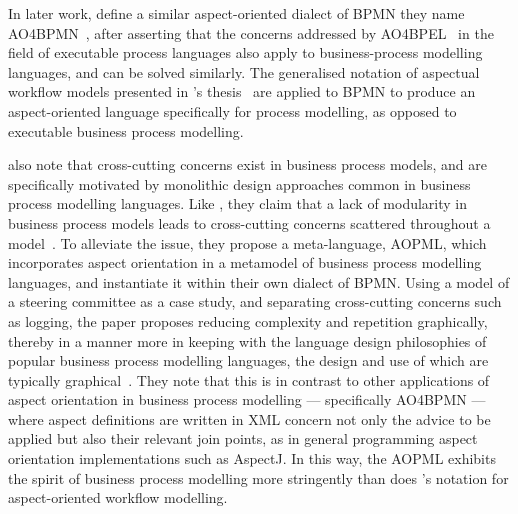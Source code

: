In later work, \citeauthor{charfi2010AO4BPMN} define a similar aspect-oriented
dialect of BPMN they name AO4BPMN~\cite{charfi2010AO4BPMN}, after asserting that
the concerns addressed by
AO4BPEL~\cite{Charfi2006AspectOrientedWL,charfi2007ao4bpel} in the field of
executable process languages also apply to business-process modelling languages,
and can be solved similarly. The generalised notation of aspectual
workflow models presented in \citeauthor{Charfi2006AspectOrientedWL}'s
thesis~\cite{Charfi2006AspectOrientedWL} are applied to BPMN to produce an
aspect-oriented language specifically for process modelling, as opposed to
executable business process modelling. 

 also note that cross-cutting concerns exist in
business process models, and are specifically motivated by monolithic design
approaches common in business process modelling languages. Like
\citeauthor{kiczales1997aspect}, they claim that a lack of modularity in
business process models leads to cross-cutting concerns scattered throughout a
model~\cite{Cappelli_AOBPM}. To alleviate the issue, they propose a
meta-language, AOPML, which incorporates aspect orientation in a metamodel of
business process modelling languages, and instantiate it within their own
dialect of BPMN. Using a model of a steering committee as a case study, and
separating cross-cutting concerns such as logging, the paper proposes reducing
complexity and repetition graphically, thereby in a manner more in keeping with
the language design philosophies of popular business process modelling
languages, the design and use of which are typically
graphical~\cite{OMG-BPMN-SPEC,opm_original,OMG-UML-SPEC}. They note that this is
in contrast to other applications of aspect orientation in business process
modelling --- specifically AO4BPMN --- where aspect definitions are written in
XML concern not only the advice to be applied but also their relevant join
points, as in general programming aspect orientation implementations such as
AspectJ. In this way, the AOPML exhibits the spirit of business process
modelling more stringently than does \citeauthor{Charfi2006AspectOrientedWL}'s
notation for aspect-oriented workflow modelling.

